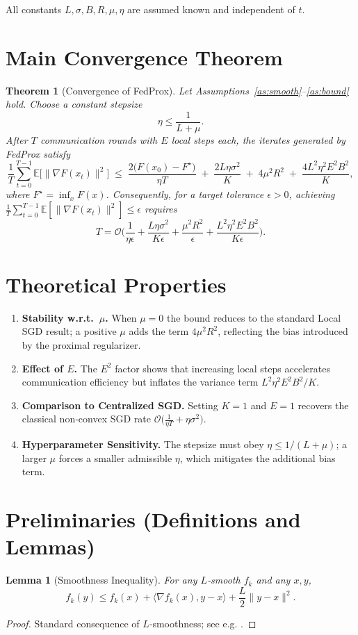 \documentclass{article}
\newtheorem{theorem}{Theorem}
\newtheorem{lemma}{Lemma}
\begin{document}
All constants $L,\sigma,B,R,\mu,\eta$ are assumed known and independent of $t$.

\section*{Main Convergence Theorem}
\begin{theorem}[Convergence of FedProx]\label{thm:main}
Let Assumptions~\ref{as:smooth}–\ref{as:bound} hold.  
Choose a constant stepsize 
\[
\eta\le\frac{1}{L+\mu}.
\]
After $T$ communication rounds with $E$ local steps each, the iterates generated by FedProx satisfy
\[
\frac{1}{T}\sum_{t=0}^{T-1}\mathbb{E}\big[\|\nabla F(x_t)\|^{2}\big]
\;\le\;
\frac{2\big(F(x_0)-F^{\star}\big)}{\eta T}
\;+\;
\frac{2L\eta\sigma^{2}}{K}
\;+\;
4\mu^{2}R^{2}
\;+\;
\frac{4L^{2}\eta^{2}E^{2}B^{2}}{K},
\tag{4}
\]
where $F^{\star}=\inf_{x}F(x)$.  
Consequently, for a target tolerance $\epsilon>0$, achieving
$\frac{1}{T}\sum_{t=0}^{T-1}\mathbb{E}[\|\nabla F(x_t)\|^{2}]\le\epsilon$ requires
\[
T = \mathcal{O}\!\Bigg(\frac{1}{\eta\epsilon}
      +\frac{L\eta\sigma^{2}}{K\epsilon}
      +\frac{\mu^{2}R^{2}}{\epsilon}
      +\frac{L^{2}\eta^{2}E^{2}B^{2}}{K\epsilon}\Bigg).
\]
\end{theorem}

\section*{Theoretical Properties}
\begin{enumerate}[label=\arabic*.]
\item \textbf{Stability w.r.t.\ $\mu$.}  
When $\mu=0$ the bound reduces to the standard Local SGD result; a positive $\mu$ adds the term $4\mu^{2}R^{2}$, reflecting the bias introduced by the proximal regularizer.
\item \textbf{Effect of $E$.}  
The $E^{2}$ factor shows that increasing local steps accelerates communication efficiency but inflates the variance term $L^{2}\eta^{2}E^{2}B^{2}/K$.
\item \textbf{Comparison to Centralized SGD.}  
Setting $K=1$ and $E=1$ recovers the classical non‑convex SGD rate $\mathcal{O}\big(\frac{1}{\eta T}+\eta\sigma^{2}\big)$.
\item \textbf{Hyperparameter Sensitivity.}  
The stepsize must obey $\eta\le 1/(L+\mu)$; a larger $\mu$ forces a smaller admissible $\eta$, which mitigates the additional bias term.
\end{enumerate}

\section*{Preliminaries (Definitions and Lemmas)}
\begin{lemma}[Smoothness Inequality]\label{lem:smooth}
For any $L$‑smooth $f_k$ and any $x,y$,
\[
f_k(y)\le f_k(x)+\langle\nabla f_k(x),y-x\rangle+\frac{L}{2}\|y-x\|^{2}.
\]
\end{lemma}
\begin{proof}
Standard consequence of $L$‑smoothness; see e.g. \cite{Nesterov2004}. \qedhere
\end{proof}
\end{document}
